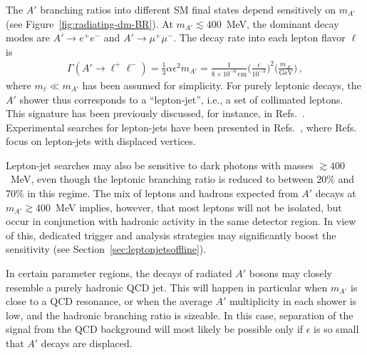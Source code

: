 The $A'$ branching ratios into different SM final states depend sensitively on $m_{A'}$ (see Figure~\ref{fig:radiating-dm-BR}). At $m_{A'} \lesssim 400$~MeV, the dominant decay modes are $A' \to e^+e^-$ and $A' \to \mu^+ \mu^-$. The decay rate into each lepton flavor $\ell$ is
\begin{align}
  \Gamma(A' \to \ell^+\ell^-) =
    \frac{1}{3} \alpha \epsilon^2 m_{A'}
    = \frac{1}{8 \times 10^{-6}\,\text{cm}}
      \bigg( \frac{\epsilon}{10^{-3}} \bigg)^2
      \bigg( \frac{m_{A'}}{\text{GeV}} \bigg) \,,
\end{align}
where $m_\ell \ll m_{A'}$ has been assumed for simplicity. For purely leptonic decays, the $A'$ shower thus corresponds to a ``lepton-jet'', i.e., a set of collimated leptons. This signature has been previously discussed, for instance, in Refs.~\cite{ArkaniHamed:2008qp,Cheung:2009su, Katz:2009qq, Bai:2009it, Baumgart:2009tn, Chan:2011aa,Falkowski:2010gv, Curtin:2013fra, Gupta:2015lfa, Autran:2015mfa}. Experimental searches for lepton-jets have been presented in Refs.~\cite{Aad:2014yea, Aad:2015sms, Aad:2019tua, Khachatryan:2015wka}, where Refs.~\cite{Aad:2014yea, Aad:2019tua} focus on lepton-jets with displaced vertices.

Lepton-jet searches may also be sensitive to dark photons with masses $\gtrsim 400$~MeV, even though the leptonic branching ratio is reduced to between 20\% and 70\% in this regime. The mix of leptons and hadrons expected from $A'$ decays at $m_{A'} \gtrsim 400$~MeV implies, however, that most leptons will not be isolated, but occur in conjunction with hadronic activity in the same detector region. In view of this, dedicated trigger and analysis strategies may significantly boost the sensitivity (see Section~\ref{sec:leptonjetsoffline}).

In certain parameter regions, the decays of radiated $A'$ bosons may closely resemble a purely hadronic QCD jet. This will happen in particular when $m_{A'}$ is close to a QCD resonance, or when the average $A'$ multiplicity in each shower is low, and the hadronic branching ratio is sizeable. In this case, separation of the signal from the QCD background will most likely be possible only if $\epsilon$ is so small that $A'$ decays are displaced.

